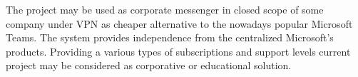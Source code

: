 %
The project may be used as corporate messenger in closed scope of some company under VPN as cheaper alternative to the
nowadays popular Microsoft Teams.
The system provides independence from the centralized Microsoft's products.
Providing a various types of subscriptions and support levels current project may be considered as corporative or
educational solution.

